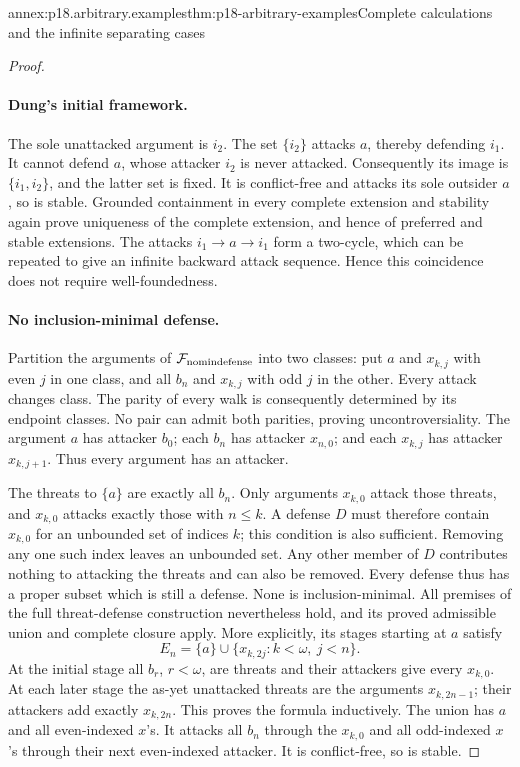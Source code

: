 \begin{annexitem}{annex:p18.arbitrary.examples}{thm:p18-arbitrary-examples}{Complete calculations and the infinite separating cases}
\begin{proof}
\paragraph{Dung's initial framework.}
The sole unattacked
argument is \(i_2\).
The set \(\{i_2\}\)
attacks \(a\), thereby
defending \(i_1\).
It cannot defend \(a\),
whose attacker \(i_2\)
is never attacked.
Consequently its image
is \(\{i_1,i_2\}\),
and the latter set
is fixed. It is
conflict-free and
attacks its sole
outsider \(a\), so
is stable. Grounded
containment in every
complete extension
and stability again
prove uniqueness of
the complete extension,
and hence of preferred
and stable extensions.
The attacks \(i_1\to a\to i_1\)
form a two-cycle, which
can be repeated to give
an infinite backward attack
sequence. Hence this
coincidence does not
require well-foundedness.

\paragraph{No inclusion-minimal defense.}
Partition the arguments
of \(\mathcal F_{\rm nomindefense}\)
into two classes: put
\(a\) and \(x_{k,j}\)
with even \(j\) in
one class, and all
\(b_n\) and \(x_{k,j}\)
with odd \(j\) in
the other. Every
attack changes class.
The parity of every
walk is consequently
determined by its
endpoint classes.
No pair can admit
both parities, proving
uncontroversiality.
The argument \(a\)
has attacker \(b_0\);
each \(b_n\) has
attacker \(x_{n,0}\);
and each \(x_{k,j}\)
has attacker \(x_{k,j+1}\).
Thus every argument
has an attacker.

The threats to \(\{a\}\)
are exactly all \(b_n\).
Only arguments \(x_{k,0}\)
attack those threats,
and \(x_{k,0}\) attacks
exactly those with \(n\leq k\).
A defense \(D\) must
therefore contain \(x_{k,0}\)
for an unbounded set
of indices \(k\);
this condition is
also sufficient.
Removing any one
such index leaves
an unbounded set.
Any other member
of \(D\) contributes
nothing to attacking
the threats and
can also be removed.
Every defense thus
has a proper subset
which is still a
defense. None is
inclusion-minimal.
All premises of the
full threat-defense
construction nevertheless
hold, and its proved
admissible union and
complete closure apply.
More explicitly, its stages
starting at \(a\) satisfy
\[
 E_n=\{a\}\cup\{x_{k,2j}:k<\omega,\ j<n\}.
\]
At the initial stage all
\(b_r\), \(r<\omega\), are threats and their
attackers give every
\(x_{k,0}\). At each
later stage the as-yet
unattacked threats are
the arguments \(x_{k,2n-1}\);
their attackers add
exactly \(x_{k,2n}\).
This proves the formula
inductively. The union
has \(a\) and all
even-indexed \(x\)'s.
It attacks all \(b_n\)
through the \(x_{k,0}\)
and all odd-indexed
\(x\)'s through their
next even-indexed attacker.
It is conflict-free,
so is stable.


\end{proof}
\end{annexitem}
